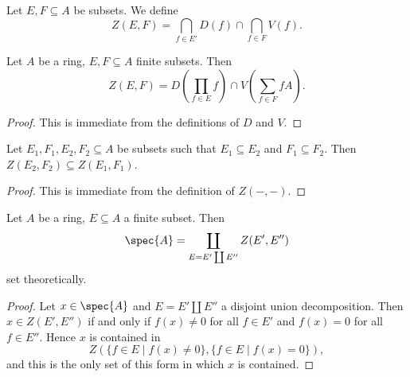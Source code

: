 \begin{definition}
    Let $E, F \subseteq A$ be subsets. We define
    \[
    Z(E, F) = \bigcap_{f \in E'} D(f) \cap \bigcap_{f \in F} V(f)
    .\]
    \label{def:subset-stratum}
    \leanok
\end{definition}

\begin{lemma}
    Let $A$ be a ring, $E, F \subseteq A$ finite subsets. Then
    \[
    Z(E, F) = D\left( \prod_{f \in E}  f \right) \cap V\left( \sum_{f \in F} fA \right)
    .\]
    \label{lemma:subset-stratum-equals-inter}
    \leanok
\end{lemma}

\begin{proof}
    \leanok
    This is immediate from the definitions of $D$ and $V$.
\end{proof}

\begin{lemma}
    Let $E_1, F_1, E_2, F_2 \subseteq A$ be subsets such that $E_1 \subseteq E_2$ and
    $F_1 \subseteq F_2$. Then $Z(E_2, F_2) \subseteq Z(E_1, F_1)$.
    \label{lemma:subset-stratum-mono}
    \leanok
\end{lemma}

\begin{proof}
    \leanok
    This is immediate from the definition of $Z(-, -)$.
\end{proof}

\begin{lemma}
    Let $A$ be a ring, $E \subseteq A$ a finite subset. Then
    \[
        \spec{A} = \coprod_{E = E' \coprod E''} Z(E', E'')
    \] set theoretically.
    \label{lemma:subset-stratification}
    \leanok
\end{lemma}

\begin{proof}
    \leanok
    Let $x \in \spec{A}$ and $E = E' \coprod E''$ a disjoint union decomposition. Then
    $x \in Z(E', E'')$ if and only if $f(x) \neq 0$ for all $f \in E'$ and $f(x) = 0$
    for all $f \in E''$. Hence $x$ is contained in
    \[
    Z(\{ f \in E  \mid f(x) \neq 0\}, \{f \in E  \mid f(x) = 0\})
    ,\] and this is the only set of this form in which $x$ is contained.
\end{proof}

